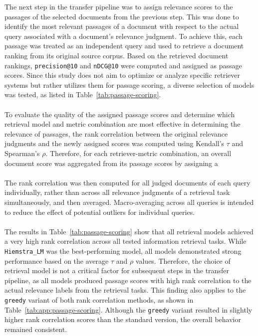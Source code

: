 The next step in the transfer pipeline was to assign relevance scores to the passages of the selected documents from the previous step. This was done to identify the most relevant passages of a document with respect to the actual query associated with a document's relevance judgment. To achieve this, each passage was treated as an independent query and used to retrieve a document ranking from its original source corpus. Based on the retrieved document rankings, \texttt{precision@10} and \texttt{nDCG@10} were computed and assigned as passage scores. Since this study does not aim to optimize or analyze specific retriever systems but rather utilizes them for passage scoring, a diverse selection of models was tested, as listed in Table~\ref{tab:passage-scoring}.
\\\\
To evaluate the quality of the assigned passage scores and determine which retrieval model and metric combination are most effective in determining the relevance of passages, the rank correlation between the original relevance judgments and the newly assigned scores was computed using Kendall's $\tau$ and Spearman's $\rho$. Therefore, for each retriever-metric combination, an overall document score was aggregated from its passage scores by assigning a 
\\\\
The rank correlation was then computed for all judged documents of each query individually, rather than across all relevance judgments of a retrieval task simultaneously, and then averaged. Macro-averaging across all queries is intended to reduce the effect of potential outliers for individual queries.
\\\\
The results in Table~\ref{tab:passage-scoring} show that all retrieval models achieved a very high rank correlation across all tested information retrieval tasks. While \texttt{Hiemstra\_LM} was the best-performing model, all models demonstrated strong performance based on the average $\tau$ and $\rho$ values. Therefore, the choice of retrieval model is not a critical factor for subsequent steps in the transfer pipeline, as all models produced passage scores with high rank correlation to the actual relevance labels from the retrieval tasks. This finding also applies to the \texttt{greedy} variant of both rank correlation methods, as shown in Table~\ref{tab:app:passage-scoring}. Although the \texttt{greedy} variant resulted in slightly higher rank correlation scores than the standard version, the overall behavior remained consistent.
